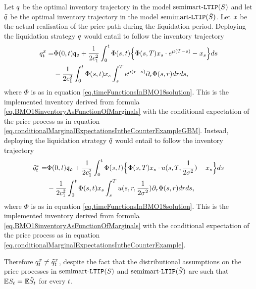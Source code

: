 \documentclass[10pt,a4paper]{article}
\begin{document}
\begin{example}
Let $q$ be the optimal inventory trajectory in the model $\text{semimart-}\mathtt{LTIP}(S)$ and let $\tilde{q}$ be the optimal inventory trajectory in the model $\text{semimart-}\mathtt{LTIP}(\tilde{S})$. Let $x$ be the actual realisation of the price path during the liquidation period. Deploying the liquidation strategy $q$ would entail to follow the inventory trajectory 
\begin{equation*}
\begin{split}
q^{x}_t =& \Phi(0,t)\mathfrak{q_0} + \frac{1}{2c_{1}^{2}} \int_{0}^{t} \Phi(s,t)
\Big\lbrace
\Phi(s,T) x_s \cdot e^{\mu(T-s)} - x_s
\Big\rbrace ds \\
& - 
\frac{1}{2c_{1}^{2}} \int_{0}^{t} \Phi(s,t)
 x_s \int_{s}^{T}  e^{\mu(r-s)} \partial_r \Phi(s,r)dr ds,
\end{split}
\end{equation*}
where $\Phi$ is as in equation \eqref{eq.timeFunctionsInBMO18solution}.
This is the implemented inventory derived from formula  \eqref{eq.BMO18inventoryAsFunctionOfMarginals} with the conditional expectation of the price process as in equation \eqref{eq.conditionalMarginalExpectationsIntheCounterExampleGBM}. Instead, deploying the liquidation strategy $\tilde{q}$ would entail to follow the inventory trajectory 
\begin{equation*}
\begin{split}
\tilde{q}^{x}_t =& \Phi(0,t)\mathfrak{q_0} + \frac{1}{2c_{1}^{2}} \int_{0}^{t} \Phi(s,t)
\Big\lbrace
\Phi(s,T) x_s \cdot u(s,T,\frac{1}{2\sigma^{2}}) - x_s
\Big\rbrace ds \\
& - 
\frac{1}{2c_{1}^{2}} \int_{0}^{t} \Phi(s,t)
 x_s\int_{s}^{T}u(s,r,\frac{1}{2\sigma^{2}}) \partial_r \Phi(s,r)dr ds,
\end{split}
\end{equation*}
where $\Phi$ is as in equation \eqref{eq.timeFunctionsInBMO18solution}.
This is the  implemented inventory derived from formula  \eqref{eq.BMO18inventoryAsFunctionOfMarginals} with the conditional expectation of the price process as in equation \eqref{eq.conditionalMarginalExpectationsIntheCounterExample}.

Therefore $	q^{x}_t \neq\tilde{q}^{x}_t$, despite the fact that the distributional assumptions on the price processes in $\text{semimart-}\mathtt{LTIP}(S)$ and $\text{semimart-}\mathtt{LTIP}(\tilde{S})$ are such that $\mathbb{{E}} S_t  = \mathbb{{E}} \tilde{S}_t$ for every $t$. 

\end{example}
\end{document}
